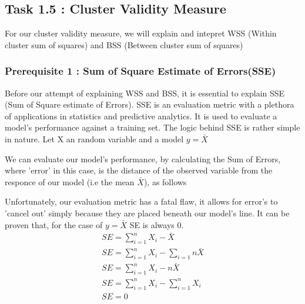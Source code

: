 \subsection*{Task 1.5 : Cluster Validity Measure}
For our cluster validity measure, we will explain and intepret WSS (Within cluster sum of squares) and BSS (Between cluster sum of squares)
\subsubsection*{Prerequisite 1 : Sum of Square Estimate of Errors(SSE)}
Before our attempt of explaining WSS and BSS, it is essential to explain SSE (Sum of Square estimate of Errors). SSE is an evaluation metric with a plethora of applications in statistics and predictive analytics\cite{???}. It is used to evaluate a model's performance against a training set\cite{???}. The logic behind SSE is rather simple in nature. Let X an random variable and a model $y=\bar{X}$

We can evaluate our model's performance, by calculating the Sum of Errors, where 'error' in this case, is the distance of the observed variable from the responce of our model (i.e the mean $\bar{X}$), as follows

Unfortunately, our evaluation metric has a fatal flaw, it allows for error's to 'cancel out' simply because they are placed beneath our model's line. It can be proven that, for the case of $y=\bar{X}$ SE is always 0.
\iffalse
\begin{align}
	SE = \sum_{i=1}^{n}{X_i-\bar{X}} \\
	SE = \sum_{i=1}^{n}{X_i} - \sum_{i=1}{n}{\bar{X}} \\
	SE = \sum_{i=1}^{n}{X_i} - n\bar{X} \\
	SE = \sum_{i=1}^{n}{X_i} - \sum_{i=1}^{n}{X_i} \\
	SE = 0 \\
\end{align}
